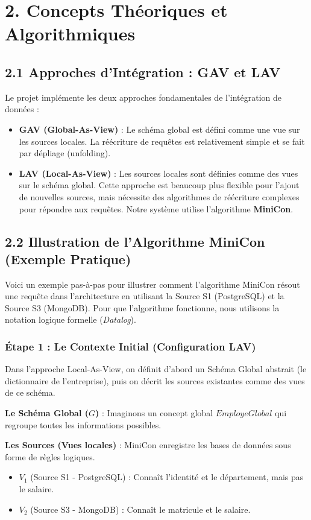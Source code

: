 \documentclass[11pt,a4paper]{article}
\begin{document}
\newpage


\section{2. Concepts Théoriques et Algorithmiques}

\subsection{2.1 Approches d'Intégration : GAV et LAV}
Le projet implémente les deux approches fondamentales de l'intégration de données :
\begin{itemize}
    \item \textbf{GAV (Global-As-View)} : Le schéma global est défini comme une vue sur les sources locales. La réécriture de requêtes est relativement simple et se fait par dépliage (unfolding).
    \item \textbf{LAV (Local-As-View)} : Les sources locales sont définies comme des vues sur le schéma global. Cette approche est beaucoup plus flexible pour l'ajout de nouvelles sources, mais nécessite des algorithmes de réécriture complexes pour répondre aux requêtes. Notre système utilise l'algorithme \textbf{MiniCon}.
\end{itemize}

\subsection{2.2 Illustration de l'Algorithme MiniCon (Exemple Pratique)}
Voici un exemple pas-à-pas pour illustrer comment l'algorithme MiniCon résout une requête dans l'architecture en utilisant la Source S1 (PostgreSQL) et la Source S3 (MongoDB).
Pour que l'algorithme fonctionne, nous utilisons la notation logique formelle (\textit{Datalog}).

\subsubsection{Étape 1 : Le Contexte Initial (Configuration LAV)}
Dans l'approche Local-As-View, on définit d'abord un Schéma Global abstrait (le dictionnaire de l'entreprise), puis on décrit les sources existantes comme des vues de ce schéma.

\textbf{Le Schéma Global ($G$)} :
Imaginons un concept global $EmployeGlobal$ qui regroupe toutes les informations possibles.

\textbf{Les Sources (Vues locales)} :
MiniCon enregistre les bases de données sous forme de règles logiques.
\begin{itemize}
    \item $V_1$ (Source S1 - PostgreSQL) : Connaît l'identité et le département, mais pas le salaire.
    \item $V_2$ (Source S3 - MongoDB) : Connaît le matricule et le salaire.
\end{itemize}
\end{document}
